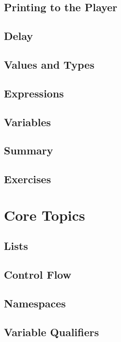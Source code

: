 \documentclass[oneside]{book}
\begin{document}
\section{Printing to the Player}
\blindtext

\section{Delay}
\blindtext

\section{Values and Types}
\blindtext

\section{Expressions}
\blindtext

\section{Variables}
\blindtext

\section{Summary}
\blindtext

\section{Exercises}
\blindtext

\chapter{Core Topics}
\blindtext

\section{Lists}
\blindtext

\section{Control Flow}
\blindtext

\section{Namespaces}
\blindtext

\section{Variable Qualifiers}
\blindtext
\end{document}
